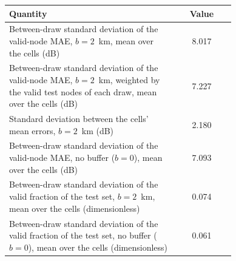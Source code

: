 \begin{tabular}{>{\raggedright\arraybackslash}p{0.74\linewidth}c}
\toprule
Quantity & Value \\
\midrule
Between-draw standard deviation of the valid-node MAE, $b=2$~km, mean over the cells (dB) & 8.017 \\
Between-draw standard deviation of the valid-node MAE, $b=2$~km, weighted by the valid test nodes of each draw, mean over the cells (dB) & 7.227 \\
Standard deviation between the cells' mean errors, $b=2$~km (dB) & 2.180 \\
Between-draw standard deviation of the valid-node MAE, no buffer ($b=0$), mean over the cells (dB) & 7.093 \\
Between-draw standard deviation of the valid fraction of the test set, $b=2$~km, mean over the cells (dimensionless) & 0.074 \\
Between-draw standard deviation of the valid fraction of the test set, no buffer ($b=0$), mean over the cells (dimensionless) & 0.061 \\
\bottomrule
\end{tabular}
